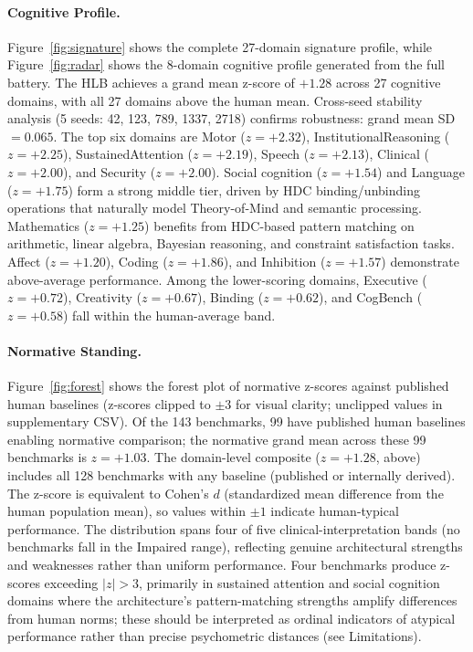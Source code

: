 \documentclass[11pt,letterpaper]{article}
\newcommand{\hlb}{\textsc{HLB}}
\begin{document}
\paragraph{Cognitive Profile.} Figure~\ref{fig:signature} shows the complete 27-domain signature profile, while Figure~\ref{fig:radar} shows the 8-domain cognitive profile generated from the full battery. The \hlb{} achieves a grand mean z-score of $+1.28$ across 27 cognitive domains, with all 27 domains above the human mean. Cross-seed stability analysis (5 seeds: 42, 123, 789, 1337, 2718) confirms robustness: grand mean SD~$= 0.065$. The top six domains are Motor ($z = +2.32$), InstitutionalReasoning ($z = +2.25$), SustainedAttention ($z = +2.19$), Speech ($z = +2.13$), Clinical ($z = +2.00$), and Security ($z = +2.00$). Social cognition ($z = +1.54$) and Language ($z = +1.75$) form a strong middle tier, driven by HDC binding/unbinding operations that naturally model Theory-of-Mind and semantic processing. Mathematics ($z = +1.25$) benefits from HDC-based pattern matching on arithmetic, linear algebra, Bayesian reasoning, and constraint satisfaction tasks. Affect ($z = +1.20$), Coding ($z = +1.86$), and Inhibition ($z = +1.57$) demonstrate above-average performance. Among the lower-scoring domains, Executive ($z = +0.72$), Creativity ($z = +0.67$), Binding ($z = +0.62$), and CogBench ($z = +0.58$) fall within the human-average band.

\paragraph{Normative Standing.} Figure~\ref{fig:forest} shows the forest plot of normative z-scores against published human baselines (z-scores clipped to $\pm 3$ for visual clarity; unclipped values in supplementary CSV). Of the 143 benchmarks, 99 have published human baselines enabling normative comparison; the normative grand mean across these 99 benchmarks is $z = +1.03$. The domain-level composite ($z = +1.28$, above) includes all 128 benchmarks with any baseline (published or internally derived). The z-score is equivalent to Cohen's $d$ (standardized mean difference from the human population mean), so values within $\pm 1$ indicate human-typical performance. The distribution spans four of five clinical-interpretation bands (no benchmarks fall in the Impaired range), reflecting genuine architectural strengths and weaknesses rather than uniform performance. Four benchmarks produce z-scores exceeding $|z| > 3$, primarily in sustained attention and social cognition domains where the architecture's pattern-matching strengths amplify differences from human norms; these should be interpreted as ordinal indicators of atypical performance rather than precise psychometric distances (see Limitations).
\end{document}
